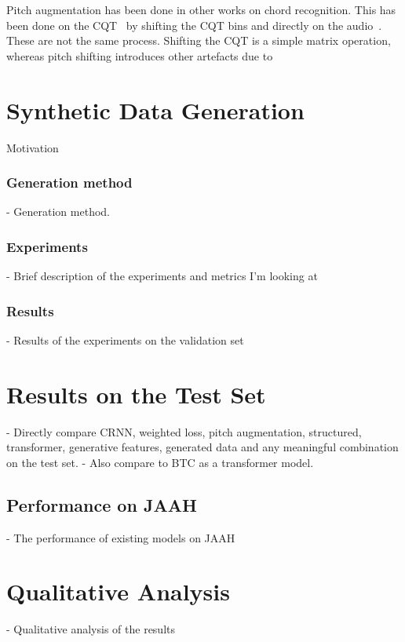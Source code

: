Pitch augmentation has been done in other works on chord recognition. This has been done on the CQT~\citep{ACRLargeVocab1} by shifting the CQT bins and directly on the audio~\citep{BTC,StructuredTraining}. These are not the same process. Shifting the CQT is a simple matrix operation, whereas pitch shifting introduces other artefacts due to 


\section{Synthetic Data Generation}\label{chap:synthetic_data}

Motivation

\subsubsection{Generation method} 
- Generation method. 
\subsubsection{Experiments}
- Brief description of the experiments and metrics I'm looking at
\subsubsection{Results}
- Results of the experiments on the validation set

\section{Results on the Test Set}

- Directly compare CRNN, weighted loss, pitch augmentation, structured, transformer, generative features, generated data and any meaningful combination on the test set.
- Also compare to BTC as a transformer model.

\subsection{Performance on JAAH}
- The performance of existing models on JAAH


\section{Qualitative Analysis}
- Qualitative analysis of the results